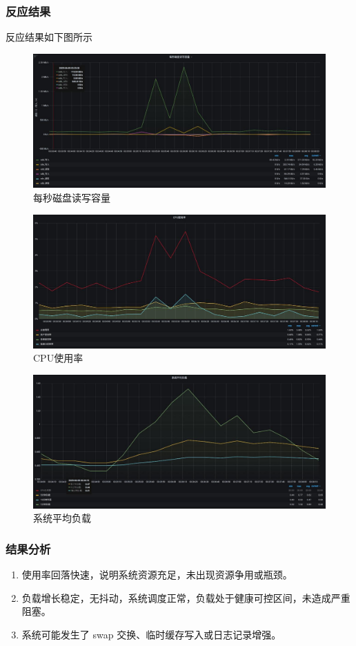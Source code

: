 \documentclass[hyperref,a4paper,UTF8]{ctexart}
\begin{document}
\subsubsection{反应结果}
反应结果如下图所示
\begin{figure}[H]
    \centering
    \includegraphics[width=0.75\linewidth]{故障注入/1.png}
    \caption{每秒磁盘读写容量}
    \label{fig:enter-label}
\end{figure}
\begin{figure}[H]
    \centering
    \includegraphics[width=0.75\linewidth]{故障注入/2.png}
    \caption{CPU使用率}
    \label{fig:enter-label}
\end{figure}
\begin{figure}[H]
    \centering
    \includegraphics[width=0.75\linewidth]{故障注入/3.png}
    \caption{系统平均负载}
    \label{fig:enter-label}
\end{figure}
\subsubsection{结果分析}
\begin{enumerate}
    \item 使用率回落快速，说明系统资源充足，未出现资源争用或瓶颈。
    \item 负载增长稳定，无抖动，系统调度正常，负载处于健康可控区间，未造成严重阻塞。
    \item 系统可能发生了 swap 交换、临时缓存写入或日志记录增强。
\end{enumerate}
\end{document}
